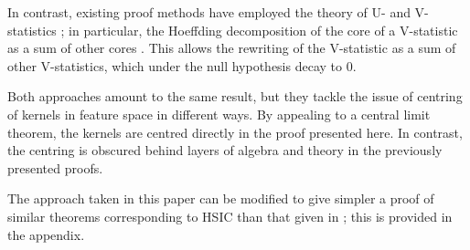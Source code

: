 \documentclass[]{article}
\begin{document}
In contrast, existing proof methods have employed the theory of U- and V-statistics \cite{chwialkowski2014kernel,chwialkowski2014wild}; in particular, the Hoeffding decomposition of the core of a V-statistic as a sum of other cores \cite{serfling2009approximation}. This allows the rewriting of the V-statistic as a sum of other V-statistics, which under the null hypothesis decay to 0.

Both approaches amount to the same result, but they tackle the issue of centring of kernels in feature space in different ways. By appealing to a central limit theorem, the kernels are centred directly in the proof presented here. In contrast, the centring is obscured behind layers of algebra and theory in the previously presented proofs.

The approach taken in this paper can be modified to give simpler a proof of similar theorems corresponding to HSIC than that given in \cite{chwialkowski2014wild}; this is provided in the appendix.
\end{document}
